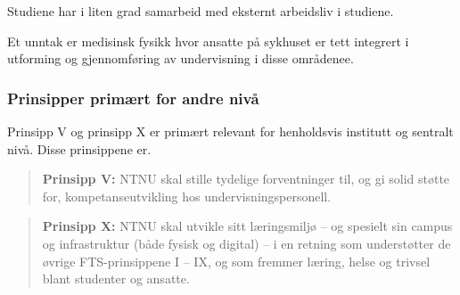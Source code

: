 Studiene har i liten grad samarbeid med eksternt arbeidsliv i studiene.

Et unntak er medisinsk fysikk hvor ansatte på sykhuset er tett integrert i utforming og gjennomføring av undervisning i disse områdenee.

\subsubsection{Prinsipper primært for andre nivå}

Prinsipp V og prinsipp X er primært relevant for henholdsvis institutt og sentralt nivå. Disse prinsippene er.

\begin{quote}
	\textbf{Prinsipp V:} NTNU skal stille tydelige forventninger til, og gi solid støtte for, kompetanseutvikling hos undervisningspersonell.
\end{quote}

\begin{quote}
	\textbf{Prinsipp X:} NTNU skal utvikle sitt læringsmiljø – og spesielt sin campus og infrastruktur (både fysisk og digital) – i en retning som understøtter de øvrige FTS-prinsippene I – IX, og som fremmer læring, helse og trivsel blant studenter og ansatte.
\end{quote}

